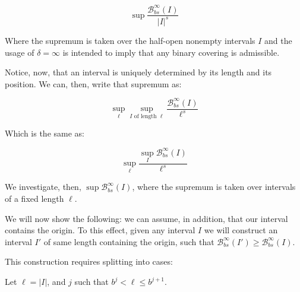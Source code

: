 \documentclass[11pt]{amsart}
\newcommand{\BB}{\mathcal{B}}
\begin{document}
\[\sup \frac{\BB_{bs}^\infty(I)}{\lvert I \rvert^s}\]

Where the supremum is taken over the half-open nonempty intervals $I$ and the usage of $\delta = \infty$ is intended to imply that any binary covering is admissible.

Notice, now, that an interval is uniquely determined by its length and its position. We can, then, write that supremum as:

\[\sup_\ell \sup_\text{$I$ of length $\ell$} \frac{\BB_{bs}^\infty(I)}{\ell^s}\]

Which is the same as:

\[\sup_\ell \frac{\sup_I \BB_{bs}^\infty(I)}{\ell^s}\]

We investigate, then, $\sup \BB_{bs}^\infty(I)$, where the supremum is taken over intervals of a fixed length $\ell$.

We will now show the following: we can assume, in addition, that our interval contains the origin. To this effect, given any interval $I$ we will construct an interval $I'$ of same length containing the origin, such that $\BB_{bs}^\infty(I') \geq \BB_{bs}^\infty(I)$.

This construction requires splitting into cases:

Let $\ell = \lvert I \rvert$, and $j$ such that $b^j < \ell \leq b^{j+1}$.
\end{document}
